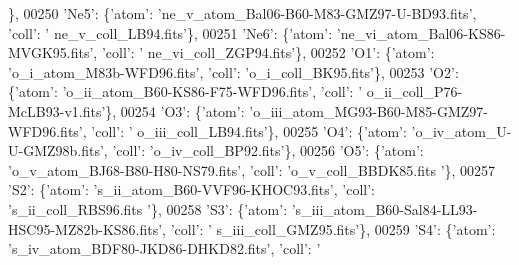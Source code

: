 \begin{DoxyCode}
      \},
00250                             \textcolor{stringliteral}{'Ne5'}: \{\textcolor{stringliteral}{'atom'}: \textcolor{stringliteral}{'ne\_v\_atom\_Bal06-B60-M83-GMZ97-U-BD93.fits'}, \textcolor{stringliteral}{'coll'}: \textcolor{stringliteral}{'
      ne\_v\_coll\_LB94.fits'}\},
00251                             \textcolor{stringliteral}{'Ne6'}: \{\textcolor{stringliteral}{'atom'}: \textcolor{stringliteral}{'ne\_vi\_atom\_Bal06-KS86-MVGK95.fits'}, \textcolor{stringliteral}{'coll'}: \textcolor{stringliteral}{'
      ne\_vi\_coll\_ZGP94.fits'}\},
00252                             \textcolor{stringliteral}{'O1'}: \{\textcolor{stringliteral}{'atom'}: \textcolor{stringliteral}{'o\_i\_atom\_M83b-WFD96.fits'}, \textcolor{stringliteral}{'coll'}: \textcolor{stringliteral}{'o\_i\_coll\_BK95.fits'}\},
00253                             \textcolor{stringliteral}{'O2'}: \{\textcolor{stringliteral}{'atom'}: \textcolor{stringliteral}{'o\_ii\_atom\_B60-KS86-F75-WFD96.fits'}, \textcolor{stringliteral}{'coll'}: \textcolor{stringliteral}{'
      o\_ii\_coll\_P76-McLB93-v1.fits'}\},
00254                             \textcolor{stringliteral}{'O3'}: \{\textcolor{stringliteral}{'atom'}: \textcolor{stringliteral}{'o\_iii\_atom\_MG93-B60-M85-GMZ97-WFD96.fits'}, \textcolor{stringliteral}{'coll'}: \textcolor{stringliteral}{'
      o\_iii\_coll\_LB94.fits'}\},
00255                             \textcolor{stringliteral}{'O4'}: \{\textcolor{stringliteral}{'atom'}: \textcolor{stringliteral}{'o\_iv\_atom\_U-U-GMZ98b.fits'}, \textcolor{stringliteral}{'coll'}: \textcolor{stringliteral}{'o\_iv\_coll\_BP92.fits'}\},
00256                             \textcolor{stringliteral}{'O5'}: \{\textcolor{stringliteral}{'atom'}: \textcolor{stringliteral}{'o\_v\_atom\_BJ68-B80-H80-NS79.fits'}, \textcolor{stringliteral}{'coll'}: \textcolor{stringliteral}{'o\_v\_coll\_BBDK85.fits
      '}\},
00257                             \textcolor{stringliteral}{'S2'}: \{\textcolor{stringliteral}{'atom'}: \textcolor{stringliteral}{'s\_ii\_atom\_B60-VVF96-KHOC93.fits'}, \textcolor{stringliteral}{'coll'}: \textcolor{stringliteral}{'s\_ii\_coll\_RBS96.fits
      '}\},
00258                             \textcolor{stringliteral}{'S3'}: \{\textcolor{stringliteral}{'atom'}: \textcolor{stringliteral}{'s\_iii\_atom\_B60-Sal84-LL93-HSC95-MZ82b-KS86.fits'}, \textcolor{stringliteral}{'coll'}: \textcolor{stringliteral}{'
      s\_iii\_coll\_GMZ95.fits'}\},
00259                             \textcolor{stringliteral}{'S4'}: \{\textcolor{stringliteral}{'atom'}: \textcolor{stringliteral}{'s\_iv\_atom\_BDF80-JKD86-DHKD82.fits'}, \textcolor{stringliteral}{'coll'}: \textcolor{stringliteral}{'
}
\end{DoxyCode}
